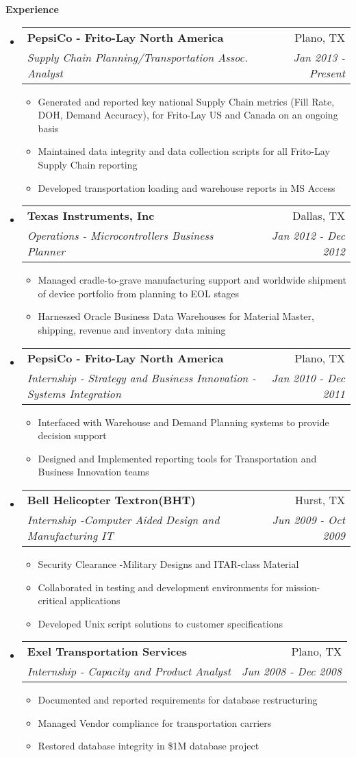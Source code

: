 \documentclass[letterpaper,11pt]{article}
\makeatletter
\newcommand{\resitem}[1]{\item #1 \vspace{-3pt}}
\newcommand{\resheading}[1]{{\large {\textbf{#1 \vphantom{p\^{E}}}}}}
\newcommand{\ressubheading}[4]{
	\begin{tabular*}{6.5in}{l@{\extracolsep{\fill}}r}
			\textbf{#1} & #2 \\
			\textit{#3} & \textit{#4} \\
	\end{tabular*}\vspace{-6pt}}
\makeatother
\begin{document}
\resheading{Experience}
\begin{itemize}

\item
	\ressubheading{PepsiCo - Frito-Lay North America}{Plano, TX}{Supply Chain 
	Planning/Transportation Assoc. Analyst}{Jan 2013 - Present}
	\begin{itemize}
		\resitem{Generated and reported key national Supply Chain metrics (Fill 
		Rate, DOH, Demand Accuracy), for Frito-Lay US and Canada on an ongoing basis} 
		\resitem{Maintained data integrity and data collection scripts for all 
		Frito-Lay Supply Chain reporting}
		\resitem{Developed transportation loading and warehouse reports in MS Access}
	\end{itemize}

	

\newpage
\item
	\ressubheading{Texas Instruments, Inc}{Dallas, TX}{Operations - 
	Microcontrollers Business Planner}{Jan 2012 - Dec 2012}
	\begin{itemize}
		\resitem{Managed cradle-to-grave manufacturing support and worldwide 
		shipment of device portfolio from planning to EOL stages} 
		\resitem{Harnessed Oracle Business Data Warehouses for Material Master, 
		shipping, revenue and inventory data mining}
	\end{itemize}


\item
	\ressubheading{PepsiCo - Frito-Lay North America}{Plano, TX}{Internship - 
		Strategy and Business Innovation - Systems Integration}{Jan 2010 - Dec 2011}
	\begin{itemize}
		\resitem{Interfaced with Warehouse and Demand Planning systems to provide 
		decision support}
		\resitem{Designed and Implemented reporting tools for Transportation and 
		Business Innovation teams}
	\end{itemize}

\item
	\ressubheading{Bell Helicopter Textron(BHT)}{Hurst, TX}{Internship -Computer 
		Aided Design and Manufacturing IT}{Jun 2009 - Oct 2009}
	\begin{itemize}
		\resitem{Security Clearance -Military Designs and ITAR-class Material}
		\resitem{Collaborated in testing and development environments for mission-
			critical applications}
		\resitem{Developed Unix script solutions to customer specifications}
	\end{itemize}

\item
	\ressubheading{Exel Transportation Services}{Plano, TX}{Internship - Capacity 
		and Product Analyst}{Jun 2008 - Dec 2008}
	\begin{itemize}
		\resitem{Documented and reported requirements for database restructuring}
		\resitem{Managed Vendor compliance for transportation carriers}
		\resitem{Restored database integrity in \$1M database project}
	\end{itemize}

\end{itemize}
\end{document}
